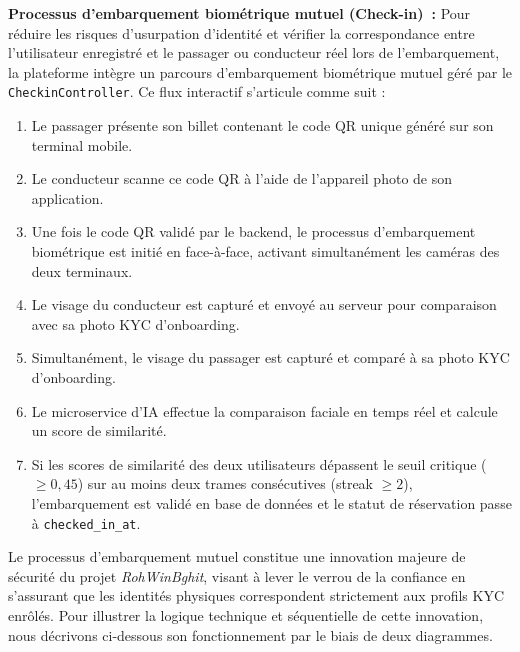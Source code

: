 \noindent\textbf{Processus d'embarquement biométrique mutuel (Check-in)~:}
Pour réduire les risques d'usurpation d'identité et vérifier la correspondance entre l'utilisateur enregistré et le passager ou conducteur réel lors de l'embarquement, la plateforme intègre un parcours d'embarquement biométrique mutuel géré par le \texttt{CheckinController}. Ce flux interactif s'articule comme suit :
\begin{enumerate}
  \item Le passager présente son billet contenant le code QR unique généré sur son terminal mobile.
  \item Le conducteur scanne ce code QR à l'aide de l'appareil photo de son application.
  \item Une fois le code QR validé par le backend, le processus d'embarquement biométrique est initié en face-à-face, activant simultanément les caméras des deux terminaux.
  \item Le visage du conducteur est capturé et envoyé au serveur pour comparaison avec sa photo KYC d'onboarding.
  \item Simultanément, le visage du passager est capturé et comparé à sa photo KYC d'onboarding.
  \item Le microservice d'IA effectue la comparaison faciale en temps réel et calcule un score de similarité.
  \item Si les scores de similarité des deux utilisateurs dépassent le seuil critique ($\ge 0{,}45$) sur au moins deux trames consécutives (streak $\ge 2$), l'embarquement est validé en base de données et le statut de réservation passe à \texttt{checked\_in\_at}.
\end{enumerate}

Le processus d'embarquement mutuel constitue une innovation majeure de sécurité du projet \textit{RohWinBghit}, visant à lever le verrou de la confiance en s'assurant que les identités physiques correspondent strictement aux profils KYC enrôlés. Pour illustrer la logique technique et séquentielle de cette innovation, nous décrivons ci-dessous son fonctionnement par le biais de deux diagrammes.

